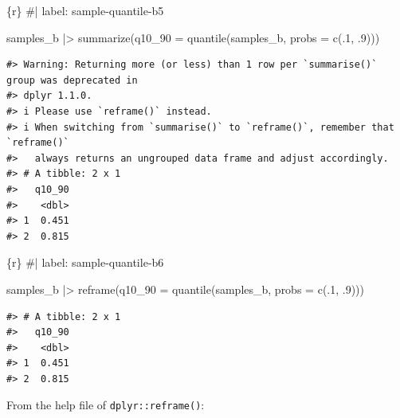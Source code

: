 \documentclass[
  letterpaper,
  DIV=11,
  numbers=noendperiod]{scrreprt}
\newenvironment{Shaded}{\begin{snugshade}}{\end{snugshade}}
\newcommand{\AttributeTok}[1]{\textcolor[rgb]{0.40,0.45,0.13}{#1}}
\newcommand{\CommentTok}[1]{\textcolor[rgb]{0.37,0.37,0.37}{#1}}
\newcommand{\DecValTok}[1]{\textcolor[rgb]{0.68,0.00,0.00}{#1}}
\newcommand{\FunctionTok}[1]{\textcolor[rgb]{0.28,0.35,0.67}{#1}}
\newcommand{\InformationTok}[1]{\textcolor[rgb]{0.37,0.37,0.37}{#1}}
\newcommand{\NormalTok}[1]{\textcolor[rgb]{0.00,0.23,0.31}{#1}}
\newcommand{\SpecialCharTok}[1]{\textcolor[rgb]{0.37,0.37,0.37}{#1}}
\begin{document}
\begin{Shaded}
\begin{Highlighting}[]
\InformationTok{\textasciigrave{}\textasciigrave{}\textasciigrave{}\{r\}}
\CommentTok{\#| label: sample{-}quantile{-}b5}

\NormalTok{samples\_b }\SpecialCharTok{|\textgreater{}} 
    \FunctionTok{summarize}\NormalTok{(}\AttributeTok{q10\_90 =} \FunctionTok{quantile}\NormalTok{(samples\_b, }\AttributeTok{probs =} \FunctionTok{c}\NormalTok{(.}\DecValTok{1}\NormalTok{, .}\DecValTok{9}\NormalTok{)))}
\InformationTok{\textasciigrave{}\textasciigrave{}\textasciigrave{}}
\end{Highlighting}
\end{Shaded}

\begin{verbatim}
#> Warning: Returning more (or less) than 1 row per `summarise()` group was deprecated in
#> dplyr 1.1.0.
#> i Please use `reframe()` instead.
#> i When switching from `summarise()` to `reframe()`, remember that `reframe()`
#>   always returns an ungrouped data frame and adjust accordingly.
#> # A tibble: 2 x 1
#>   q10_90
#>    <dbl>
#> 1  0.451
#> 2  0.815
\end{verbatim}

\begin{Shaded}
\begin{Highlighting}[]
\InformationTok{\textasciigrave{}\textasciigrave{}\textasciigrave{}\{r\}}
\CommentTok{\#| label: sample{-}quantile{-}b6}

\NormalTok{samples\_b }\SpecialCharTok{|\textgreater{}} 
    \FunctionTok{reframe}\NormalTok{(}\AttributeTok{q10\_90 =} \FunctionTok{quantile}\NormalTok{(samples\_b, }\AttributeTok{probs =} \FunctionTok{c}\NormalTok{(.}\DecValTok{1}\NormalTok{, .}\DecValTok{9}\NormalTok{)))}
\InformationTok{\textasciigrave{}\textasciigrave{}\textasciigrave{}}
\end{Highlighting}
\end{Shaded}

\begin{verbatim}
#> # A tibble: 2 x 1
#>   q10_90
#>    <dbl>
#> 1  0.451
#> 2  0.815
\end{verbatim}

From the help file of \texttt{dplyr::reframe()}:
\end{document}
